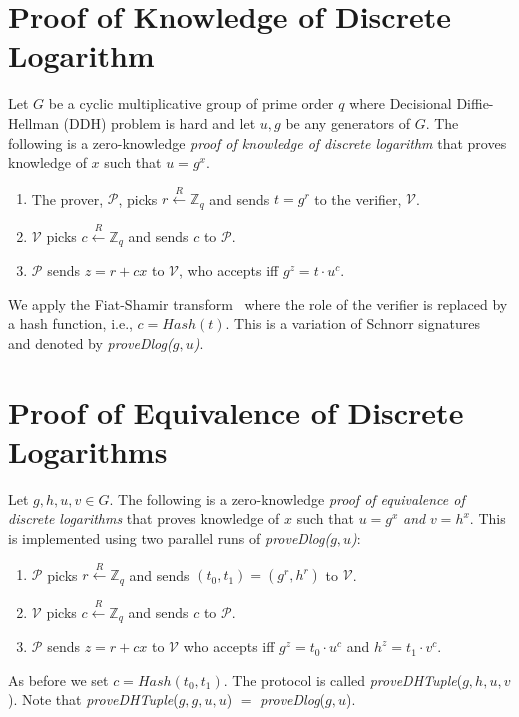 \documentclass[runningheads]{llncs}
\begin{document}
\section{Proof of Knowledge of Discrete Logarithm}
\label{provedlog}

Let $G$ be a cyclic multiplicative group of prime order $q$ where Decisional Diffie-Hellman (DDH) problem is hard and let $u, g$ be any generators of $G$.
The following is a zero-knowledge {\em proof of knowledge of discrete logarithm} that proves knowledge of $x$ such that $u = g^x$.
\begin{enumerate}
\item The prover, $\mathcal{P}$, picks $r \stackrel{R}{\leftarrow} \mathbb{Z}_q$ and sends $t = g^r$ to the verifier, $\mathcal{V}$.
\item $\mathcal{V}$ picks $c \stackrel{R}{\leftarrow} \mathbb{Z}_q$ and sends $c$ to $\mathcal{P}$.
\item $\mathcal{P}$ sends $z = r + cx$ to $\mathcal{V}$, who accepts iff ${g}^z = t\cdot {u}^c$.
\end{enumerate}

We apply the Fiat-Shamir transform~\cite{fiatshamir} where the role of the verifier is replaced by a hash function, i.e., $c = Hash(t)$.
This is a variation of Schnorr signatures~\cite{Sch91} and denoted by \emph{proveDlog($g, u$)}.

\section{Proof of Equivalence of Discrete Logarithms}
\label{provedhtuple}
Let $g, h, u, v \in G$. The following is a zero-knowledge {\em proof of equivalence of discrete logarithms} that proves knowledge of $x$ such that $u = g^x$ {\em and} $v = h^x$. This is implemented using two parallel runs of \emph{proveDlog($g, u$)}:

\begin{enumerate}
\item $\mathcal{P}$ picks $r \stackrel{R}{\leftarrow} \mathbb{Z}_q$ and sends $(t_0, t_1) = ({g}^r, {h}^r)$ to $\mathcal{V}$.
\item $\mathcal{V}$ picks $c \stackrel{R}{\leftarrow} \mathbb{Z}_q$ and sends $c$ to $\mathcal{P}$.
\item $\mathcal{P}$ sends $z = r + cx$ to $\mathcal{V}$ who accepts iff ${g}^z = {t_0}\cdot {u}^c$ and $h^z=t_1\cdot v^c$.
\end{enumerate}

As before we set $c = Hash(t_0, t_1)$. The protocol is called \emph{proveDHTuple}($g, h, u, v$). Note that \emph{proveDHTuple}($g, g, u, u$) $=$ \emph{proveDlog}($g, u$).
\end{document}
